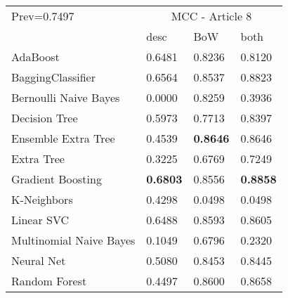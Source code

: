 \begin{tabular}{|l|l|l|l| }
\hline
Prev=0.7497 &  \multicolumn{3}{c|}{MCC - Article 8} \\
\cline{2-4} & desc & BoW & both \\ \hline
AdaBoost                & 0.6481 & 0.8236 & 0.8120\\
BaggingClassifier       & 0.6564 & 0.8537 & 0.8823\\
Bernoulli Naive Bayes   & 0.0000 & 0.8259 & 0.3936\\
Decision Tree           & 0.5973 & 0.7713 & 0.8397\\
Ensemble Extra Tree     & 0.4539 & {\bf 0.8646} & 0.8646\\
Extra Tree              & 0.3225 & 0.6769 & 0.7249\\
Gradient Boosting       & {\bf 0.6803} & 0.8556 & {\bf 0.8858}\\
K-Neighbors             & 0.4298 & 0.0498 & 0.0498\\
Linear SVC              & 0.6488 & 0.8593 & 0.8605\\
Multinomial Naive Bayes & 0.1049 & 0.6796 & 0.2320\\
Neural Net              & 0.5080 & 0.8453 & 0.8445\\
Random Forest           & 0.4497 & 0.8600 & 0.8658\\
\hline
\end{tabular}
